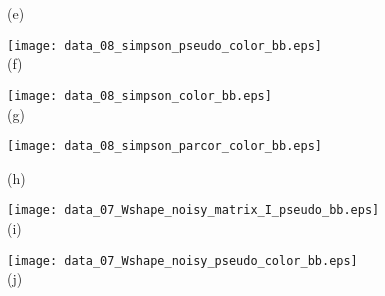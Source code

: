 \documentclass[journal]{vgtc}                %
\begin{document}
\begin{figure*}[ht!]
\begin{minipage}{0.23\textwidth}
   \hspace{-0.56cm}  \footnotesize (e) 
  \end{minipage}
  \hfill
  \begin{minipage}{0.23\textwidth}
   \centering

     \texttt{[image: data\_08\_simpson\_pseudo\_color\_bb.eps]}\\

   \hspace{-0.31cm} \footnotesize (f) 
  \end{minipage}
  \hfill
  \begin{minipage}{0.27\textwidth}
   \centering

     \texttt{[image: data\_08\_simpson\_color\_bb.eps]}\\

   \hspace{-0.18cm} \footnotesize (g) 
  \end{minipage}
  \hfill
  \begin{minipage}{0.20\textwidth}
   \centering

     \texttt{[image: data\_08\_simpson\_parcor\_color\_bb.eps]}\\ \vspace{0.4cm}

   \hspace{-0.20cm} \footnotesize (h) 
  \end{minipage} 
  
    \mbox{} \bigskip

  \begin{minipage}{0.23\textwidth}
   \centering

     \hspace{-0.3cm} \texttt{[image: data\_07\_Wshape\_noisy\_matrix\_I\_pseudo\_bb.eps]}\\

   \hspace{-0.56cm}  \footnotesize (i) 
  \end{minipage}
  \hfill
  \begin{minipage}{0.23\textwidth}
   \centering

     \texttt{[image: data\_07\_Wshape\_noisy\_pseudo\_color\_bb.eps]}\\

   \hspace{-0.31cm} \footnotesize (j) 
  \end{minipage}
  \hfill
  \begin{minipage}{0.27\textwidth}
   \centering


\end{minipage}
\end{figure*}
\end{document}
